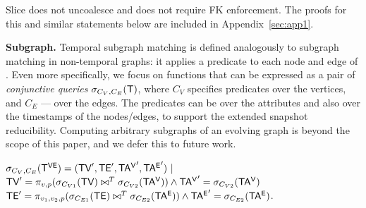 
Slice does not uncoalesce and does not require FK enforcement.  The
proofs for this and similar statements below are included in
Appendix~\ref{sec:app1}.


{\bf Subgraph.}  Temporal subgraph matching is defined analogously to
subgraph matching in non-temporal graphs: it applies a predicate to
each node and edge of \tg.   Even more specifically, we focus on functions
that can be expressed as a pair of {\em conjunctive queries}
$\sigma_{C_V,C_E} (\mathsf{T})$, where $C_V$ specifies predicates over the
vertices, and $C_E$ --- over the edges.  The predicates can be over
the attributes and also over the timestamps of the nodes/edges, to
support the extended snapshot reducibility.  Computing arbitrary
subgraphs of an evolving graph is beyond the scope of this paper, and
we defer this to future work.

$\sigma_{C_V,C_E} (\mathsf{T^{VE}}) = (\textsf{TV}',\textsf{TE}',\mathsf{TA^{V}}',\mathsf{TA^{E}}') ~|~$ \\
$\textsf{TV}' = \pi_{v,p} (\sigma_{C_{V1}} (\textsf{TV}) \bowtie^T \sigma_{C_{V2}} (\mathsf{TA^{V}})) \wedge \mathsf{TA^{V}}' = \sigma_{C_{V2}} (\mathsf{TA^{V}})$ \\
$\textsf{TE}' = \pi_{v_1,v_2,p} (\sigma_{C_{E1}} (\textsf{TE}) \bowtie^T \sigma_{C_{E2}} (\mathsf{TA^{E}})) \wedge \mathsf{TA^{E}}' = \sigma_{C_{E2}} (\mathsf{TA^{E}})$.


